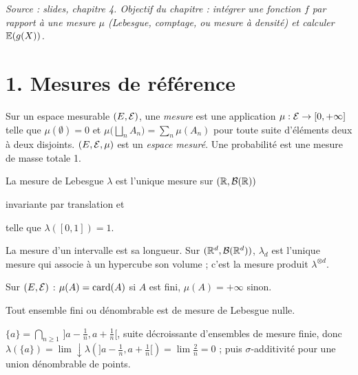 \documentclass[11pt,a4paper]{article}
\begin{document}

\textit{Source : slides, chapitre 4. Objectif du chapitre : intégrer une fonction $f$ par rapport à une mesure $\mu$
(Lebesgue, comptage, ou mesure à densité) et calculer $\mathbb{E}(g(X))$.}

\section*{1. Mesures de référence}

\begin{definition}\label{C2:mesure}
Sur un espace mesurable $(E,\mathcal{E})$, une \emph{mesure} est une application $\mu:\mathcal{E}\to[0,+\infty]$ telle que
$\mu(\emptyset)=0$ et $\mu\bigl(\bigsqcup_n A_n\bigr)=\sum_n\mu(A_n)$ pour toute suite d'éléments deux à deux disjoints.
$(E,\mathcal{E},\mu)$ est un \emph{espace mesuré}. Une probabilité est une mesure de masse totale 1.
\end{definition}

\begin{theoreme}\label{C2:lebesgue}
La mesure de Lebesgue $\lambda$ est l'unique mesure sur $(\mathbb{R},\mathcal{B}(\mathbb{R}))$
\begin{enumerate*}[label=(\arabic*)]
  \item invariante par translation et
  \item telle que $\lambda([0,1])=1$.
\end{enumerate*}
La mesure d'un intervalle est sa longueur. Sur $(\mathbb{R}^d,\mathcal{B}(\mathbb{R}^d))$, $\lambda_d$ est l'unique mesure qui associe
à un hypercube son volume ; c'est la mesure produit $\lambda^{\otimes d}$.
\end{theoreme}

\begin{definition}\label{C2:comptage}
Sur $(E,\mathcal{E})$ : $\mu(A)=\operatorname{card}(A)$ si $A$ est fini, $\mu(A)=+\infty$ sinon.
\end{definition}

\begin{proposition}\label{C2:denombrable-nul}
Tout ensemble fini ou dénombrable est de mesure de Lebesgue nulle.
\end{proposition}
\begin{idee}
$\{a\}=\bigcap_{n\ge1}\,]a-\frac1n,a+\frac1n[$, suite décroissante d'ensembles de mesure finie, donc
$\lambda(\{a\})=\lim\downarrow\lambda(]a-\frac1n,a+\frac1n[)=\lim \frac2n=0$ ; puis $\sigma$-additivité pour une union dénombrable de points.
\end{idee}
\end{document}

